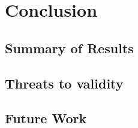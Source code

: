 %
%
%

\chapter{Conclusion}\label{ch:conclusion}

\section{Summary of Results}

\section{Threats to validity}

\section{Future Work}

